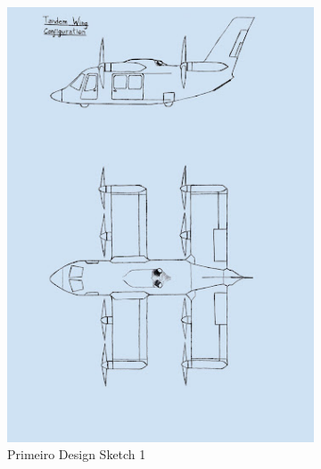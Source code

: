 \begin{figure}[h]
    \centering
    \begin{subfigure}[b]{0.47\textwidth}
        \includegraphics[width=\textwidth]{Imagens/inicialdesign1.jpg}
        \caption{Primeiro Design Sketch 1}
        \label{DesingSketchini1}
    \end{subfigure}
    \hfill
    \begin{subfigure}[b]{0.47\textwidth}

\end{subfigure}
\end{figure}
